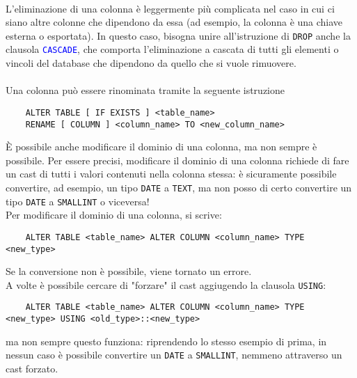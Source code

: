 \documentclass[12pt,a4paper]{book}
\begin{document}
	\paragraph{}L'eliminazione di una colonna è leggermente più complicata nel caso in cui ci siano altre colonne che dipendono da essa (ad esempio, la colonna è una chiave esterna o esportata). In questo caso, bisogna unire all'istruzione di \texttt{DROP} anche la clausola \textcolor{blue}{\texttt{CASCADE}}, che comporta l'eliminazione a cascata di tutti gli elementi o vincoli del database che dipendono da quello che si vuole rimuovere.
	\paragraph{}Una colonna può essere rinominata tramite la seguente istruzione
	\begin{lstlisting}
	ALTER TABLE [ IF EXISTS ] <table_name> 
	RENAME [ COLUMN ] <column_name> TO <new_column_name>
	\end{lstlisting}
	È possibile anche modificare il dominio di una colonna, ma non sempre è possibile. Per essere precisi, modificare il dominio di una colonna richiede di fare un cast di tutti i valori contenuti nella colonna stessa: è sicuramente possibile convertire, ad esempio, un tipo \texttt{DATE} a \texttt{TEXT}, ma non posso di certo convertire un tipo \texttt{DATE} a \texttt{SMALLINT} o viceversa!\\
	Per modificare il dominio di una colonna, si scrive:
	\begin{lstlisting}
	ALTER TABLE <table_name> ALTER COLUMN <column_name> TYPE <new_type>
	\end{lstlisting}
	Se la conversione non è possibile, viene tornato un errore.\\A volte è possibile cercare di "forzare" il cast aggiugendo la clausola \texttt{USING}:
	\begin{lstlisting}
	ALTER TABLE <table_name> ALTER COLUMN <column_name> TYPE <new_type> USING <old_type>::<new_type>
	\end{lstlisting}
	ma non sempre questo funziona: riprendendo lo stesso esempio di prima, in nessun caso è possibile convertire un \texttt{DATE} a \texttt{SMALLINT}, nemmeno attraverso un cast forzato.
\end{document}
